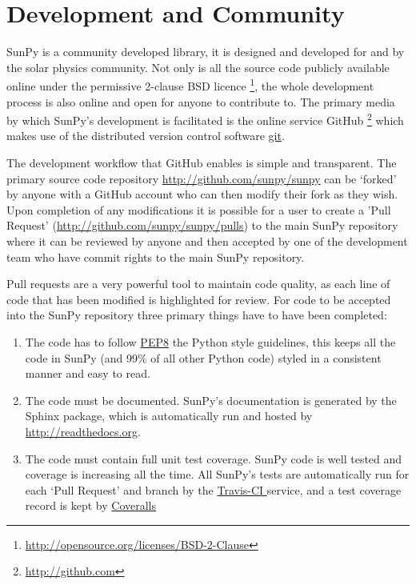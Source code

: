\section{Development and Community}
SunPy is a community developed library, it is designed and developed for and by 
the solar physics community. Not only is all the source code publicly available 
online under the permissive 2-clause BSD licence 
\footnote{\url{http://opensource.org/licenses/BSD-2-Clause}}, the whole 
development 
process is also online and open for anyone to contribute to.
The primary media by which SunPy's development is facilitated is the online 
service GitHub \footnote{\url{http://github.com}} which makes use of the 
distributed 
version control software \href{http://git-scm.com/}{git}.

The development workflow that GitHub enables is simple and transparent. The 
primary source code repository \url{http://github.com/sunpy/sunpy} can be 
`forked' by anyone with a GitHub account who can then modify their fork as they 
wish. Upon completion of any modifications it is possible for a user to create 
a 'Pull Request' (\url{http://github.com/sunpy/sunpy/pulls}) to the main SunPy 
repository where it can be reviewed by anyone and then accepted by one of the 
development team who have commit rights to the main SunPy repository.

Pull requests are a very powerful tool to maintain code quality, as each line 
of code that has been modified is highlighted for review. For code to be 
accepted into the SunPy repository three primary things have to have been 
completed:

\begin{enumerate}
	\item  The code has to follow 	
	\href{http://www.python.org/dev/peps/pep-0008/}{PEP8} the Python style 
	guidelines, this keeps all the code in SunPy (and 99\% of all other Python 
	code) styled in a consistent manner and easy to read.
	
	\item The code must be documented. SunPy's documentation is generated by 
	the Sphinx package, which is automatically run and hosted by 
	\url{http://readthedocs.org}.
	
	\item The code must contain full unit test coverage. SunPy code is well 
	tested and coverage is increasing all the time. All SunPy's tests are 
	automatically run for each `Pull Request' and branch by the 
	\href{http://travis-ci.org/sunpy/sunpy}{Travis-CI }	service, and a test 
	coverage record is kept by 
	\href{http://coveralls.io/r/sunpy/sunpy}{Coveralls}
\end{enumerate}

